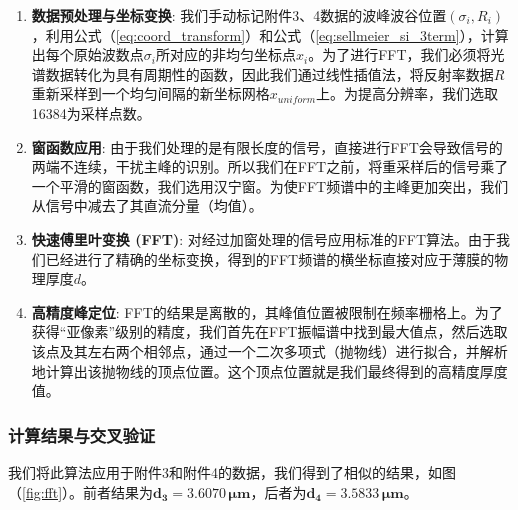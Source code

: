 \documentclass[a4paper]{ctexart}
\begin{document}
\begin{enumerate}
    \item \textbf{数据预处理与坐标变换}: 
    我们手动标记附件3、4数据的波峰波谷位置$(\sigma_i, R_i)$，利用公式（\ref{eq:coord_transform}）和公式（\ref{eq:sellmeier_si_3term}），计算出每个原始波数点$\sigma_i$所对应的非均匀坐标点$x_i$。为了进行FFT，我们必须将光谱数据转化为具有周期性的函数，因此我们通过线性插值法，将反射率数据$R$重新采样到一个均匀间隔的新坐标网格$x_{uniform}$上。为提高分辨率，我们选取16384为采样点数。

    \item \textbf{窗函数应用}: 
    由于我们处理的是有限长度的信号，直接进行FFT会导致信号的两端不连续，干扰主峰的识别。所以我们在FFT之前，将重采样后的信号乘了一个平滑的窗函数，我们选用汉宁窗。为使FFT频谱中的主峰更加突出，我们从信号中减去了其直流分量（均值）。

    \item \textbf{快速傅里叶变换 (FFT)}: 
    对经过加窗处理的信号应用标准的FFT算法。由于我们已经进行了精确的坐标变换，得到的FFT频谱的横坐标直接对应于薄膜的物理厚度$d$。

    \item \textbf{高精度峰定位}: 
    FFT的结果是离散的，其峰值位置被限制在频率栅格上。为了获得“亚像素”级别的精度，我们首先在FFT振幅谱中找到最大值点，然后选取该点及其左右两个相邻点，通过一个二次多项式（抛物线）进行拟合，并解析地计算出该抛物线的顶点位置。这个顶点位置就是我们最终得到的高精度厚度值。

    
\end{enumerate}

\subsubsection{计算结果与交叉验证}
我们将此算法应用于附件3和附件4的数据，我们得到了相似的结果，如图（\ref{fig:fft}）。前者结果为$\mathbf{d_3 = 3.6070 \, \mu m}$，后者为$\mathbf{d_4 = 3.5833 \, \mu m}$。
\end{document}
